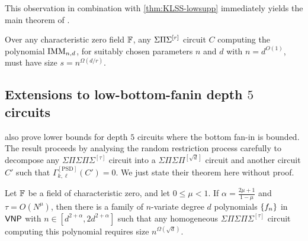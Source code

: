 This observation in combination with \autoref{thm:KLSS-lowsupp} immediately yields the main theorem of \cite{KayalSaha14}. 

\begin{theorem}\label{thm:kaysaha-main}
Over any characteristic zero field $\mathbb{F}$, any $\Sigma\Pi\Sigma^{[r]}$ circuit $C$ computing the polynomial $\mathrm{IMM}_{n,d}$, for suitably chosen parameters $n$ and $d$ with $n = d^{O(1)}$, must have size $s = n^{\Omega(d/r)}$. 
\end{theorem}

\subsection{Extensions to low-bottom-fanin depth $5$ circuits}

\cite{KayalSaha14} also prove lower bounds for depth $5$ circuits where the bottom fan-in is bounded. The result proceeds by analysing the random restriction process carefully to decompose any $\Sigma\Pi\Sigma\Pi\Sigma^{[\tau]}$ circuit into a $\Sigma\Pi\Sigma\Pi^{[\sqrt{d}]}$ circuit and another circuit $C'$ such that $\Gamma_{k,\ell}^{[\mathrm{PSD}]}(C') = 0$. We just state their theorem here without proof. 

\begin{theorem}\label{thm:kaysaha-d5}
Let $\mathbb{F}$ be a field of characteristic zero, and let $0\leq \mu < 1$. If $\alpha  = \frac{2\mu + 1}{1 - \mu}$ and $\tau = O(N^\mu)$, then there is a family of $n$-variate degree $d$ polynomials $\left\{f_n\right\}$ in $\mathsf{VNP}$ with $n\in [d^{2+\alpha}, 2d^{2+\alpha}]$ such that any homogeneous $\Sigma\Pi\Sigma\Pi\Sigma^{[\tau]}$ circuit computing this polynomial requires size $n^{\Omega(\sqrt{d})}$. 
\end{theorem}



